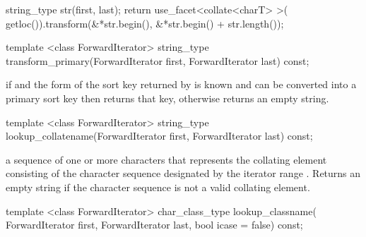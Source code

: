 \begin{itemdescr}
\pnum\effects
\begin{codeblock}
string_type str(first, last);
return use_facet<collate<charT> >(
  getloc()).transform(&*str.begin(), &*str.begin() + str.length());
\end{codeblock}
\end{itemdescr}

%
%
\begin{itemdecl}
template <class ForwardIterator>
  string_type transform_primary(ForwardIterator first, ForwardIterator last) const; 
\end{itemdecl}

\begin{itemdescr}
\pnum\effects  if 
and the form of the sort key returned
by  is known and
can be converted into a primary sort key then returns that key,
otherwise returns an empty string.
\end{itemdescr}

%
%
\begin{itemdecl}
template <class ForwardIterator>
  string_type lookup_collatename(ForwardIterator first, ForwardIterator last) const; 
\end{itemdecl}

\begin{itemdescr}
\pnum\returns  a sequence of one or more characters that
represents the collating element consisting of the character
sequence designated by the iterator range .
Returns an empty string if the character sequence is not a
valid collating element.
\end{itemdescr}

%
%
\begin{itemdecl}
template <class ForwardIterator>
  char_class_type lookup_classname(
    ForwardIterator first, ForwardIterator last, bool icase = false) const; 
\end{itemdecl}

